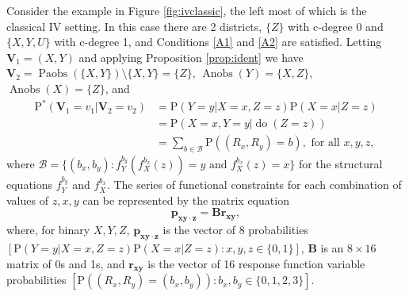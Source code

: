 \documentclass[12pt]{article}
\def\Pr{{\mathrm{P}}}
\def\Pdo{{\mathrm{P}^*}}
\DeclareMathOperator{\Anobs}{Anobs}
\DeclareMathOperator{\Paobs}{Paobs}
\newcommand{\bV}{\boldsymbol{V}}
\DeclareMathOperator{\Do}{do}
\begin{document}
Consider the example in Figure \ref{fig:ivclassic}, the left most of which is the classical IV setting. In this case there are 2 districts, $\{Z\}$ with c-degree 0 and $\{X, Y, U\}$ with c-degree 1, and Conditions \ref{A1} and \ref{A2} are satisfied. Letting $\bV_1 = (X, Y)$ and applying Proposition \ref{prop:ident} we have $\bV_2 = \Paobs(\{X, Y\}) \setminus \{X, Y\} = \{Z\}$, $\Anobs(Y) = \{X, Z\}$, $\Anobs(X) = \{Z\}$, and 
\begin{align*}
    \Pdo(\bV_1 = v_{1} |\bV_2 = v_2) &= \Pr(Y = y | X = x, Z = z) \Pr(X = x | Z = z)\\ 
    & = \Pr(X = x, Y = y | \Do(Z = z)) \\
    & = \sum_{b \in \mathcal{B}} \Pr((R_x, R_y) = b), \mbox{ for all } x, y, z,
\end{align*}
where $\mathcal{B} = \{(b_x, b_y): f^{b_y}_Y(f^{b_x}_X(z)) = y \mbox{ and } f^{b_x}_X(z) = x\}$ for the structural equations $f^{b_y}_Y$ and $f^{b_x}_X$. The series of functional constraints for each combination of values of $z, x, y$ can be represented by the matrix equation
\[
\boldsymbol{p_{xy\cdot z}} = \boldsymbol{B} \boldsymbol{r_{xy}}, 
\]
where, for binary $X, Y, Z$, $\boldsymbol{p_{xy\cdot z}}$ is the vector of 8 probabilities $[\Pr(Y = y | X = x, Z = z) \Pr(X = x | Z = z): x, y, z \in \{0, 1\}]$, $\boldsymbol{B}$ is an $8 \times 16$ matrix of 0s and 1s, and $\boldsymbol{r_{xy}}$ is the vector of 16 response function variable probabilities $[\Pr((R_x, R_y) = (b_x, b_y)): b_x, b_y \in \{0, 1, 2, 3\}]$.
\end{document}
